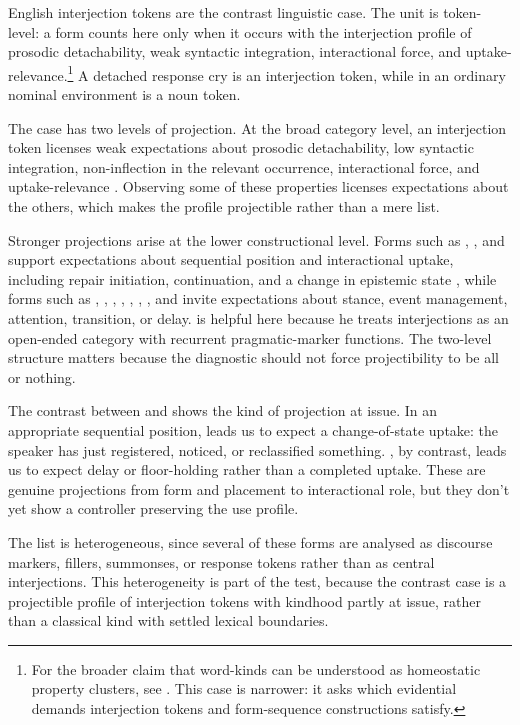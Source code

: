 \documentclass[12pt]{article}
\begin{document}
English interjection tokens are the contrast linguistic case. The unit is
token-level: a form counts here only when it occurs with the interjection profile
of prosodic detachability, weak syntactic integration, interactional force, and
uptake-relevance.\footnote{For the broader claim that word-kinds can be understood
as homeostatic property clusters, see \textcite{miller2021}. This case is
narrower: it asks which evidential demands interjection tokens and form-sequence
constructions satisfy.} A detached response cry  is an interjection
token, while  in an ordinary nominal environment is a noun token.

The case has two levels of projection. At the broad category level, an
interjection token licenses weak expectations about prosodic detachability, low
syntactic integration, non-inflection in the relevant occurrence, interactional
force, and uptake-relevance \citep{ameka1992,norrick2009}. Observing some of
these properties licenses expectations about the others, which makes the profile
projectible rather than a mere list.

Stronger projections arise at the lower constructional level. Forms such as
, , and  support expectations about
sequential position and interactional uptake, including repair initiation,
continuation, and a change in epistemic state \citep{dingemanse2024}, while forms
such as , , , ,
, , , and  invite
expectations about stance, event management, attention, transition, or delay.
\textcite{norrick2009} is helpful here because he treats interjections as an
open-ended category with recurrent pragmatic-marker functions. The two-level
structure matters because the diagnostic should not force projectibility to be all
or nothing.

The contrast between  and  shows the kind of projection at
issue. In an appropriate sequential position,  leads us to expect a
change-of-state uptake: the speaker has just registered, noticed, or reclassified
something. , by contrast, leads us to expect delay or floor-holding
rather than a completed uptake. These are genuine projections from form and
placement to interactional role, but they don't yet show a controller preserving
the use profile.

The list is heterogeneous, since several of these forms are analysed as discourse
markers, fillers, summonses, or response tokens rather than as central
interjections. This heterogeneity is part of the test, because the contrast case
is a projectible profile of interjection tokens with kindhood partly at issue,
rather than a classical kind with settled lexical boundaries.
\end{document}
